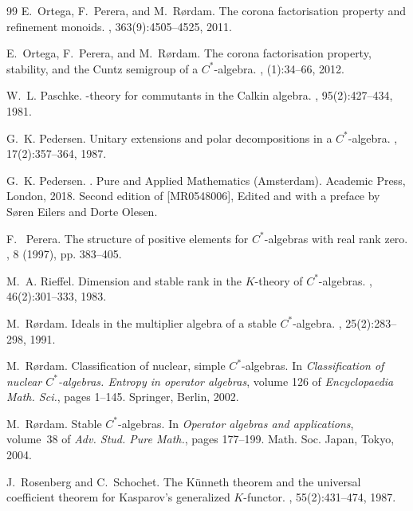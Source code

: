 \documentclass[reqno]{amsart}
\theoremstyle{definition}
\theoremstyle{remark}
\numberwithin{equation}{section}
\theoremstyle{definition}
\begin{document}
\begin{thebibliography}{99}
E.~Ortega, F.~Perera, and M.~R{\o}rdam.
\newblock The corona factorisation property and refinement monoids.
, 363(9):4505--4525, 2011.

E.~Ortega, F.~Perera, and M.~R{\o}rdam.
\newblock The corona factorisation property, stability, and the {C}untz
  semigroup of a {$C^\ast$}-algebra.
, (1):34--66, 2012.

W.~L. Paschke.
-theory for commutants in the {C}alkin algebra.
, 95(2):427--434, 1981.

G.~K. Pedersen.
\newblock Unitary extensions and polar decompositions in a {$C^\ast$}-algebra.
, 17(2):357--364, 1987.

G.~K. Pedersen.
.
\newblock Pure and Applied Mathematics (Amsterdam). Academic Press, London,
  2018.
\newblock Second edition of [MR0548006], Edited and with a preface by S\o ren
  Eilers and Dorte Olesen. 

F. ~Perera. 
\newblock The structure of positive elements for ${C^*}$-algebras with real rank zero.  
, 8 (1997), pp. 383–405.

M.~A. Rieffel.
\newblock Dimension and stable rank in the {$K$}-theory of
  {$C^{\ast}$}-algebras.
, 46(2):301--333, 1983.

M.~R{\o}rdam.
\newblock Ideals in the multiplier algebra of a stable {$C^\ast$}-algebra.
, 25(2):283--298, 1991.

M.~R{\o}rdam.
\newblock Classification of nuclear, simple {$C^*$}-algebras.
\newblock In {\em Classification of nuclear {$C^*$}-algebras. {E}ntropy in
  operator algebras}, volume 126 of {\em Encyclopaedia Math. Sci.}, pages
  1--145. Springer, Berlin, 2002.

M.~R{\o}rdam.
\newblock Stable {$C^*$}-algebras.
\newblock In {\em Operator algebras and applications}, volume~38 of {\em Adv.
  Stud. Pure Math.}, pages 177--199. Math. Soc. Japan, Tokyo, 2004.

J.~Rosenberg and C.~Schochet.
\newblock The {K}\"{u}nneth theorem and the universal coefficient theorem for
  {K}asparov's generalized {$K$}-functor.
, 55(2):431--474, 1987.


\end{thebibliography}
\end{document}

